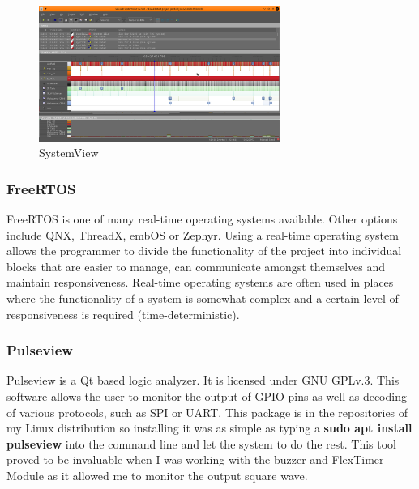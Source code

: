 \documentclass[12pt,a4paper]{article}
\begin{document}
            \begin{figure}[h]
                \centering
                \includegraphics[width=0.7\textwidth]{systemview1}
                \caption{SystemView}
            \end{figure}
        
            \subsubsection{FreeRTOS}
            FreeRTOS is one of many real-time operating systems available. Other options include QNX, 
            ThreadX, embOS or Zephyr. Using a real-time operating system allows the programmer to 
            divide the functionality of the project into individual blocks that are easier to manage, 
            can communicate amongst themselves and maintain responsiveness. Real-time operating
            systems are often used in places where the functionality of a system is somewhat complex and a
            certain level of responsiveness is required (time-deterministic).
            
            \subsubsection{Pulseview}
            Pulseview is a Qt based logic analyzer. It is licensed under GNU GPLv.3. This software  
            allows the user to monitor the output of GPIO pins as well as decoding of various protocols,
            such as SPI or UART. This package is in the repositories of my Linux distribution so 
            installing it was as simple as typing a {\bfseries sudo apt install pulseview} into the command line and let the system to do the rest. This tool proved to be invaluable when 
            I was working with the buzzer and FlexTimer Module as it allowed me to monitor the output
            square wave.
            
\end{document}
